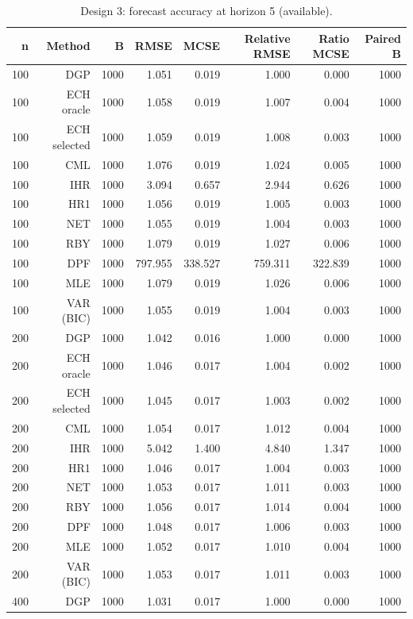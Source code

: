 \begin{table}[p]\centering
\caption{Design 3: forecast accuracy at horizon 5 (available).}
\small
\begin{tabular}{rrrrrrrr}\toprule
n & Method & B & RMSE & MCSE & Relative RMSE & Ratio MCSE & Paired B \\\midrule
100 & DGP & 1000 & 1.051 & 0.019 & 1.000 & 0.000 & 1000 \\
100 & ECH oracle & 1000 & 1.058 & 0.019 & 1.007 & 0.004 & 1000 \\
100 & ECH selected & 1000 & 1.059 & 0.019 & 1.008 & 0.003 & 1000 \\
100 & CML & 1000 & 1.076 & 0.019 & 1.024 & 0.005 & 1000 \\
100 & IHR & 1000 & 3.094 & 0.657 & 2.944 & 0.626 & 1000 \\
100 & HR1 & 1000 & 1.056 & 0.019 & 1.005 & 0.003 & 1000 \\
100 & NET & 1000 & 1.055 & 0.019 & 1.004 & 0.003 & 1000 \\
100 & RBY & 1000 & 1.079 & 0.019 & 1.027 & 0.006 & 1000 \\
100 & DPF & 1000 & 797.955 & 338.527 & 759.311 & 322.839 & 1000 \\
100 & MLE & 1000 & 1.079 & 0.019 & 1.026 & 0.006 & 1000 \\
100 & VAR (BIC) & 1000 & 1.055 & 0.019 & 1.004 & 0.003 & 1000 \\
200 & DGP & 1000 & 1.042 & 0.016 & 1.000 & 0.000 & 1000 \\
200 & ECH oracle & 1000 & 1.046 & 0.017 & 1.004 & 0.002 & 1000 \\
200 & ECH selected & 1000 & 1.045 & 0.017 & 1.003 & 0.002 & 1000 \\
200 & CML & 1000 & 1.054 & 0.017 & 1.012 & 0.004 & 1000 \\
200 & IHR & 1000 & 5.042 & 1.400 & 4.840 & 1.347 & 1000 \\
200 & HR1 & 1000 & 1.046 & 0.017 & 1.004 & 0.003 & 1000 \\
200 & NET & 1000 & 1.053 & 0.017 & 1.011 & 0.003 & 1000 \\
200 & RBY & 1000 & 1.056 & 0.017 & 1.014 & 0.004 & 1000 \\
200 & DPF & 1000 & 1.048 & 0.017 & 1.006 & 0.003 & 1000 \\
200 & MLE & 1000 & 1.052 & 0.017 & 1.010 & 0.004 & 1000 \\
200 & VAR (BIC) & 1000 & 1.053 & 0.017 & 1.011 & 0.003 & 1000 \\
400 & DGP & 1000 & 1.031 & 0.017 & 1.000 & 0.000 & 1000 \\

\end{tabular}
\end{table}
